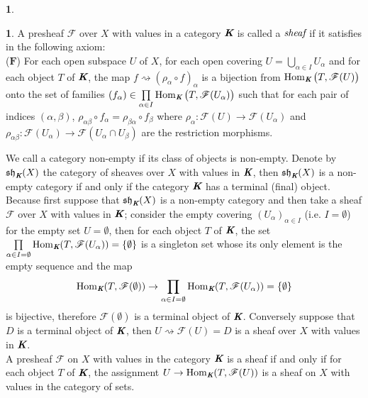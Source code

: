 \documentclass[12pt]{amsart}
\newcommand{\hm}{\operatorname{Hom}}
\newcommand{\Hom}{\operatorname{Hom}}
\newcommand{\sh}{\operatorname{\mathfrak{sh}}}
\theoremstyle{definition}
\newtheorem{bk}[proposition]{}
\begin{document}
\begin{bk}
\begin{bk}\label{I: 3.1.1} A presheaf $\mathscr{F}$ over $X$ with values in a category $\emph{\textbf{K}}$ is called a $\emph{sheaf}$ if it satisfies in the following axiom:\\
($\textbf{F}$) For each open subspace $U$ of $X$, for each open covering $U=\bigcup\limits_{\alpha\in I}U_{\alpha}$ and for each object $T$ of  $\emph{\textbf{K}}$, the map $f\rightsquigarrow (\rho_{\alpha}\circ f)_{\alpha}$ is a bijection from $\hm_{\emph{\textbf{K}}}\big(T,\mathscr{F}(U)\big)$ onto the set of families $(f_{\alpha})\in\prod\limits_{\alpha\in I}\hm_{\emph{\textbf{K}}}\big(T,\mathscr{F}(U_{\alpha})\big)$ such that for each pair of indices $(\alpha,\beta)$, $\rho_{\alpha\beta}\circ f_{\alpha}=\rho_{\beta\alpha}\circ f_{\beta}$ where $\rho_{\alpha}:
\mathscr{F}(U)\rightarrow\mathscr{F}(U_{\alpha})$
and $\rho_{\alpha\beta}:
\mathscr{F}(U_{\alpha})\rightarrow\mathscr{F}(U_{\alpha}\cap U_{\beta})$ are the restriction morphisms. \\
\end{bk}


We call a category non-empty if its class of objects is non-empty. Denote by $\sh_{\emph{\textbf{K}}}(X)$ the category of sheaves over $X$ with values in $\emph{\textbf{K}}$, then $\sh_{\emph{\textbf{K}}}(X)$ is a non-empty category if and only if the category $\emph{\textbf{K}}$ has a terminal (final) object. Because first suppose that $\sh_{\emph{\textbf{K}}}(X)$ is a non-empty category and then take a sheaf $\mathscr{F}$ over $X$ with values in $\emph{\textbf{K}}$; consider the empty covering $(U_{\alpha})_{\alpha\in I}$ (i.e. $I=\emptyset$) for the empty set $U=\emptyset$, then for each object $T$ of $\emph{\textbf{K}}$, the set $\prod\limits_{\alpha\in I=\emptyset}\Hom_{\emph{\textbf{K}}}(T, \mathscr{F}(U_{\alpha}))=\{\emptyset\}$ is a singleton set whose its only element is the empty sequence and the map $$\Hom_{\emph{\textbf{K}}}(T, \mathscr{F}(\emptyset))\rightarrow\prod\limits_{\alpha\in I=\emptyset}\Hom_{\emph{\textbf{K}}}(T, \mathscr{F}(U_{\alpha}))=\{\emptyset\}$$ is bijective, therefore $\mathscr{F}(\emptyset)$ is a terminal object of $\emph{\textbf{K}}$. Conversely suppose that $D$ is a terminal object of $\emph{\textbf{K}}$, then $U\rightsquigarrow\mathscr{F}(U)=D$ is a sheaf over $X$ with values in $\emph{\textbf{K}}$. \\

A presheaf $\mathscr{F}$ on $X$ with values in the category $\emph{\textbf{K}}$ is a sheaf if and only if for each object $T$ of $\emph{\textbf{K}}$, the assignment $U\rightarrow\Hom_{\emph{\textbf{K}}}(T, \mathscr{F}(U))$ is a sheaf on $X$ with values in the category of sets. \\
\end{bk}
\end{document}
